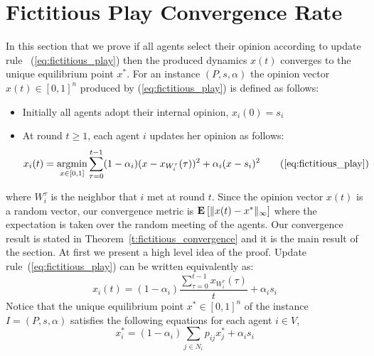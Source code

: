 \section{Fictitious Play Convergence Rate}\label{s:fictitious_convergence}
In this section that we prove if all agents select 
their opinion according to update rule
~(\ref{eq:fictitious_play}) then the produced dynamics 
$x(t)$ converges to the unique equilibrium point $x^*$.
For an instance $(P,s,\alpha)$ the opinion vector $x(t) \in [0,1]^n$
produced by (\ref{eq:fictitious_play}) is defined as follows:
\begin{itemize}
 \item Initially all agents adopt their internal opinion, $x_i(0)=s_i$
 \item At round $t \geq 1$, each agent $i$ updates her opinion as follows:
 \begin{equation}
  x_i(t) =
  \argmin_{x \in [0,1]}\sum_{\tau=0}^{t-1}
  (1-\alpha_i)(x-x_{W_i^\tau}(\tau))^2+\alpha_i(x-s_i)^2 \tag{\ref{eq:fictitious_play}}
\end{equation}
\end{itemize}
where $W_i^\tau$ is the neighbor that $i$ met at round $t$. 
Since the opinion vector $x(t)$ is a random vector,
our convergence metric is $\bm{\mathrm{E}}_{} \left[ \| x(t) - x^* \|_{\infty} \right]$
where the expectation is taken over the random meeting of the agents.
Our convergence result is stated in Theorem~\ref{t:fictitious_convergence}
and it is the main result of the section.
%
%
\noindent At first we present a high level idea of the proof. 
Update rule~(\ref{eq:fictitious_play}) can be written equivalently as:
\[
  x_i(t)=(1-\alpha_i)\frac{\sum_{\tau=0}^{t-1} x_{W_i^\tau}(\tau)}{t}+ \alpha_i s_i
\]
Notice that the unique equilibrium point $x^* \in [0,1]^n$ of the 
instance $I=(P,s,\alpha)$ satisfies the following equations
for each agent $i \in V$,
\[x_i^*= (1-\alpha_i)\sum_{j \in N_i}p_{ij}x_j^* + \alpha_is_i\]
